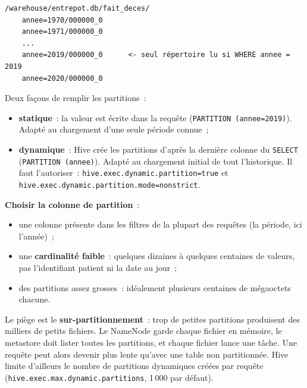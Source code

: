 \begin{center}
\begin{minipage}{0.92\textwidth}
\begin{tcolorbox}[colback=title2!6,colframe=title1,boxsep=2pt]
\begin{verbatim}
/warehouse/entrepot.db/fait_deces/
    annee=1970/000000_0
    annee=1971/000000_0
    ...
    annee=2019/000000_0      <- seul répertoire lu si WHERE annee = 2019
    annee=2020/000000_0
\end{verbatim}
\end{tcolorbox}
\end{minipage}
\end{center}

\noindent Deux façons de remplir les partitions~:
\begin{itemize}
	\item \textbf{statique}~: la valeur est écrite dans la requête (\texttt{PARTITION (annee=2019)}). Adapté au chargement d'une seule période connue~;
	\item \textbf{dynamique}~: Hive crée les partitions d'après la dernière colonne du \texttt{SELECT} (\texttt{PARTITION (annee)}). Adapté au chargement initial de tout l'historique. Il faut l'autoriser~: \texttt{hive.exec.dynamic.partition=true} et \texttt{hive.exec.dynamic.partition.mode=nonstrict}.
\end{itemize}

\noindent \textbf{Choisir la colonne de partition}~:
\begin{itemize}
	\item une colonne présente dans les filtres de la plupart des requêtes (la période, ici l'année)~;
	\item une \textbf{cardinalité faible}~: quelques dizaines à quelques centaines de valeurs, pas l'identifiant patient ni la date au jour~;
	\item des partitions assez grosses~: idéalement plusieurs centaines de mégaoctets chacune.
\end{itemize}

\noindent Le piège est le \textbf{sur-partitionnement}~: trop de petites partitions produisent des milliers de petits fichiers. Le NameNode garde chaque fichier en mémoire, le metastore doit lister toutes les partitions, et chaque fichier lance une tâche. Une requête peut alors devenir plus lente qu'avec une table non partitionnée. Hive limite d'ailleurs le nombre de partitions dynamiques créées par requête (\texttt{hive.exec.max.dynamic.partitions}, 1\,000 par défaut).

